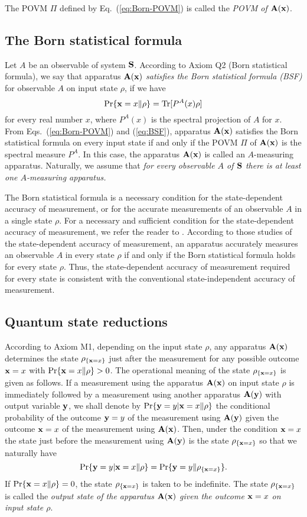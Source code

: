 \documentclass[12pt]{article}
\newcommand{\eeq}{\end{equation}}
\newcommand{\beql}[1]{\begin{equation}\label{eq:#1}}
\newcommand{\bA}{{\bf A}}
\newcommand{\bS}{{\bf S}}
\newcommand{\rh}{\rho}
\newcommand{\Eq}[1]{Eq.~(\ref{eq:#1})}
\newcommand{\Tr}{\mbox{\rm Tr}}
\newcommand{\bx}{{\bf x}}
\newcommand{\by}{{\bf y}}
\newcommand{\eq}[1]{(\ref{eq:#1})}
\begin{document}
The POVM $\Pi$ defined by \Eq{Born-POVM} is called the {\em POVM of
$\bA(\bx)$}.  


\subsection{The Born statistical formula}

Let $A$ be an observable of system $\bS$.
According to Axiom Q2 (Born statistical formula),
we say that apparatus $\bA(\bx)$ {\em satisfies the Born statistical
formula (BSF)} for observable $A$ on input state $\rh$, if we have
\beql{BSF}
\Pr\{\bx=x\|\rh\}=\Tr[P^{A}(x)\rh]
\eeq
for every real number $x$, 
where  $P^{A}(x)$ is the spectral projection of $A$ for $x$.
From Eqs.~\eq{Born-POVM} and \eq{BSF}, apparatus $\bA(\bx)$  
satisfies the Born statistical formula on every input state if and only if 
the POVM $\Pi$ of $\bA(\bx)$ is the spectral measure $P^{A}$.
In this case, the apparatus $\bA(\bx)$ is called an $A$-measuring apparatus.
Naturally, we assume that {\em for every observable $A$ of $\bS$ there 
is at least one $A$-measuring apparatus.}

The Born statistical formula is a necessary condition for the state-dependent
accuracy of measurement, or for the accurate measurements of an observable
$A$ in a single state $\rh$.
For a necessary and sufficient condition for the state-dependent accuracy of 
measurement, we refer the reader to \cite{05PCN,06QPC,19A1}.
According to those studies of the state-dependent accuracy of 
measurement, an apparatus accurately measures 
an observable $A$ in every state $\rh$ if and only if the Born statistical 
formula holds for every state $\rh$.  Thus, the state-dependent accuracy 
of measurement required for every state is consistent with the conventional 
state-independent accuracy of measurement.

\subsection{Quantum state reductions}
According to Axiom M1, 
depending on the input state $\rh$, 
any apparatus $\bA(\bx)$ determines the state 
$\rh_{\{\bx=x\}}$ just after the measurement for any possible 
outcome $\bx=x$ with $\Pr\{\bx=x\|\rh\}>0$. 
The operational meaning of the state $\rh_{\{\bx=x\}}$ is 
given as follows.
If a measurement using the apparatus $\bA(\bx)$ on input state $\rh$ 
is immediately followed by a measurement using another apparatus 
$\bA(\by)$ with output variable $\by$, we shall denote by
$\Pr\{\by=y|\bx=x\|\rh\}$ the conditional probability
of the outcome $\by=y$ of the measurement using $\bA(\by)$ given
the outcome $\bx=x$ of the measurement using $\bA(\bx)$.  
Then, under the condition $\bx=x$
the state just before the measurement using $\bA(\by)$ is
the state $\rh_{\{\bx=x\}}$ so that we naturally have
\beql{020603a}
\Pr\{\by=y|\bx=x\|\rh\}=\Pr\{\by=y\|\rh_{\{\bx=x\}}\}.
\eeq
If $\Pr\{\bx=x\|\rh\}=0$, the state 
$\rh_{\{\bx=x\}}$ is taken to be indefinite.
The state $\rh_{\{\bx=x\}}$ is called the {\em output
state of the apparatus $\bA(\bx)$ given 
the outcome $\bx=x$ on input state $\rh$}.
\end{document}
